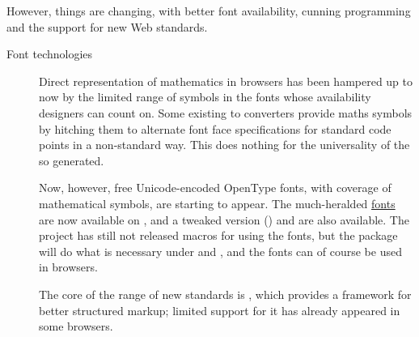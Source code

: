 However, things are changing, with
better font availability, cunning  programming and the
support for new Web standards.
\begin{description}
\item[Font technologies] Direct representation of mathematics in
  browsers has been hampered up to now by the limited range of symbols
  in the fonts whose availability designers can count on.  Some existing
  \AllTeX{} to  converters provide maths symbols by
  hitching them to alternate font face specifications for standard
  code points in a non-standard way.  This does nothing for the
  universality of the  so generated.

  Now, however, free Unicode-encoded OpenType fonts, with coverage of
  mathematical symbols, are starting to appear.  The much-heralded
  \href{http://www.stixfonts.org/}{ fonts} are now
  available on , and a tweaked version
  () and  are also
  available.  The  project has still not released macros
  for using the fonts, but the  package will do
  what is necessary under \xetex{} and \LuaTeX{}, and the fonts can of
  course be used in browsers.
\item[] The core of the range of new standards is
  , which provides a framework for better structured markup;
  limited support for it has already appeared in some browsers.


\end{description}
